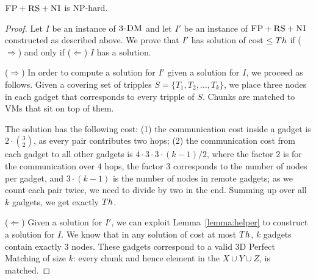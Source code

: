 \begin{theorem}
$\textsc{FP}+\textsc{RS}+\textsc{NI}$ is NP-hard.
\end{theorem}
\begin{proof}
Let $I$ be an instance of $\textsc{3-DM}$ and let $I'$ be an instance of
$\textsc{FP}+\textsc{RS}+\textsc{NI}$ constructed as described above.
We prove that $I'$ has solution of cost $\leq Th$ if ($\Rightarrow$) and only if
($\Leftarrow$)
$I$ has a solution.

($\Rightarrow$) In order to compute a solution
for $I'$ given a solution for $I$, we proceed as follows.
Given a covering set of tripples $S = \{T_1, T_2, \ldots, T_k\}$, we place three nodes in each gadget that
corresponds to every tripple of $S$. Chunks are matched to VMs that sit on top of them.

The solution has the following cost:
(1) the communication cost inside a gadget is $2 \cdot {3 \choose 2}$,
  as every pair contributes two hops;
  (2) the communication cost from each gadget to all other gadgets is $4
  \cdot 3 \cdot 3 \cdot (k - 1) / 2$, where the factor $2$ is
  for the
  communication over $4$ hops, the factor $3$
  corresponds to the number of nodes per gadget, and
  $3 \cdot (k-1)$ is the number of nodes in remote gadgets;
  as we count each pair twice, we need to divide by two in the end.
Summing up over all $k$ gadgets, we get exactly $Th$.

($\Leftarrow$) Given a solution for $I'$,
we can exploit Lemma~\ref{lemma:helper} to construct a solution for $I$.
We know that in any solution of cost at most $Th$,
$k$ gadgets contain exactly 3 nodes. These gadgets correspond to a valid
3D Perfect Matching of size $k$: every
chunk and hence element in the $X \cup Y \cup Z$, is matched.
\end{proof}

